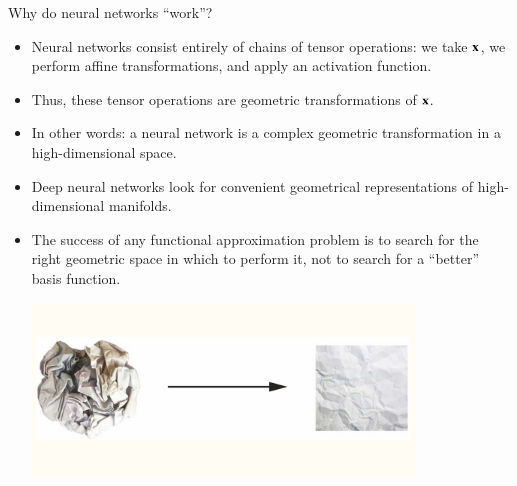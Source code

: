 \documentclass[notes, ignorenonframetext, compress, 10pt, xcolor=svgnames, aspectratio=169]{beamer}
\begin{document}
\begin{frame}[allowframebreaks]{Why do neural networks “work”?}
\begin{itemize}
  \item Neural networks consist entirely of chains of tensor operations:
   we take ${\mathbf x}$, we perform affine transformations, and apply an activation function.
\item Thus, these tensor operations are geometric transformations of ${\mathbf x}$.
\item In other words: a neural network is a complex geometric transformation 
in a high-dimensional space.
\item Deep neural networks look for convenient geometrical representations of high-dimensional manifolds.
\item The success of any functional approximation problem is to search for the 
right geometric space in which to perform it, not to search for a “better” basis function.

\framebreak 
\begin{center}
  \includegraphics[width=0.8\textwidth]{../../Ressources/Figs/Fig_NeuralNetsWhyTheyWork.png}\\
 \end{center}

\end{itemize}
\end{frame}
\end{document}
